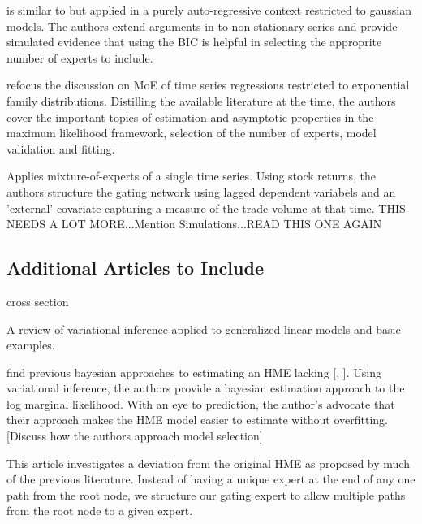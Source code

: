 \documentclass[12pt]{article}
\begin{document}
\cite{CarvalhoTanner2005} is similar to \cite{CarvalhoTanner2003} but applied
in a purely auto-regressive context restricted to gaussian models. The authors
extend arguments in \cite{CarvalhoTanner2003} to non-stationary series and
provide simulated evidence that using the BIC is helpful in selecting the 
approprite number of experts to include.

\cite{CarvalhoTanner2006} refocus the discussion on MoE of time series
regressions restricted to exponential family distributions. Distilling
the available literature at the time, the authors cover the important
topics of estimation and asymptotic properties in the maximum likelihood
framework, selection of the number of experts, model validation and
fitting.

\cite{CarvalhoSkoulakis2010} Applies mixture-of-experts of a single time series.
Using stock returns, the authors structure the gating network using lagged
dependent variabels and an 'external' covariate capturing a measure of the
trade volume at that time. THIS NEEDS A LOT MORE...Mention Simulations...READ 
THIS ONE AGAIN




\subsection{Additional Articles to Include}


\cite{JeffriesPfeiffer2001} cross section

\cite{BleiKucukelbirMcAuliffe2006} A review of variational inference applied
to generalized linear models and basic examples.

\cite{UedaGhahramani2002}

\cite{BishopSvenson2003} find previous bayesian approaches to estimating an HME
lacking [\cite{HuertaJiangTanner2003}, \cite{UedaGhahramani2002}]. Using
variational inference, the authors provide a bayesian estimation approach
to the log marginal likelihood. With an eye to prediction, the author's advocate
that their approach makes the HME model easier to estimate without overfitting.
[Discuss how the authors approach model selection]


\cite{CarvalhoSkoulakis2005}

\bigskip

This article investigates a deviation from the original HME as proposed by
much of the previous literature. Instead of having a unique expert at the 
end of any one path from the root node, we structure our gating expert to 
allow multiple paths from the root node to a given expert. 
\end{document}
